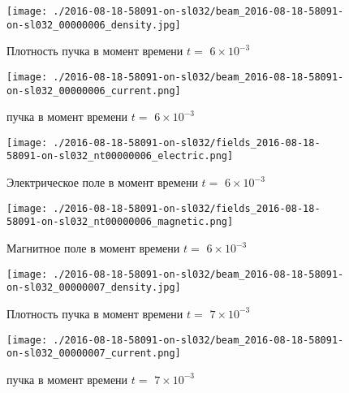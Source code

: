 \documentclass[a4paper,14pt]{extreport}
\begin{document}
\begin{center}
\begin{figure}[!hbt]
\texttt{[image: ./2016-08-18-58091-on-sl032/beam\_2016-08-18-58091-on-sl032\_00000006\_density.jpg]}
\caption{\label{density_beam6_24} Плотность пучка в момент времени $t = $ $6\times 10^{-3}$ }
\end{figure}
\end{center}
\begin{center}
\begin{figure}[!hbt]
\texttt{[image: ./2016-08-18-58091-on-sl032/beam\_2016-08-18-58091-on-sl032\_00000006\_current.png]}
\caption{\label{current_beam6_25}  пучка в момент времени $t = $ $6\times 10^{-3}$ }
\end{figure}
\end{center}
\begin{center}
\begin{figure}[!hbt]
\texttt{[image: ./2016-08-18-58091-on-sl032/fields\_2016-08-18-58091-on-sl032\_nt00000006\_electric.png]}
\caption{\label{electric_6_26} Электрическое поле  в момент времени $t = $ $6\times 10^{-3}$ }
\end{figure}
\end{center}
\begin{center}
\begin{figure}[!hbt]
\texttt{[image: ./2016-08-18-58091-on-sl032/fields\_2016-08-18-58091-on-sl032\_nt00000006\_magnetic.png]}
\caption{\label{magnetic_6_27} Магнитное поле  в момент времени $t = $ $6\times 10^{-3}$ }
\end{figure}
\end{center}
\begin{center}
\begin{figure}[!hbt]
\texttt{[image: ./2016-08-18-58091-on-sl032/beam\_2016-08-18-58091-on-sl032\_00000007\_density.jpg]}
\caption{\label{density_beam7_28} Плотность пучка в момент времени $t = $ $7\times 10^{-3}$ }
\end{figure}
\end{center}
\begin{center}
\begin{figure}[!hbt]
\texttt{[image: ./2016-08-18-58091-on-sl032/beam\_2016-08-18-58091-on-sl032\_00000007\_current.png]}
\caption{\label{current_beam7_29}  пучка в момент времени $t = $ $7\times 10^{-3}$ }
\end{figure}
\end{center}
\end{document}

